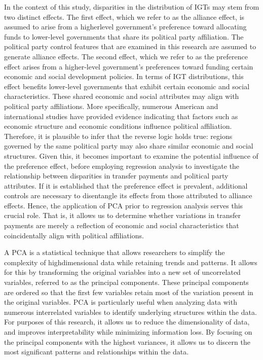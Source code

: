 In the context of this study, disparities in the distribution of IGTs may stem from two distinct effects. The first effect, which we refer to as the alliance effect, is assumed to arise from a higherlevel government's preference toward allocating funds to lower-level governments that share its political party affiliation. The political party control features that are examined in this research are assumed to generate alliance effects. The second effect, which we refer to as the preference effect arises from a higher-level government's preferences toward funding certain economic and social development policies. In terms of IGT distributions, this effect benefits lower-level governments
that exhibit certain economic and social characteristics. These shared economic and social attributes may align with political party affiliations. More specifically, numerous American and international studies have provided evidence indicating that factors such as economic structure and economic
conditions influence political affiliation. Therefore, it is plausible to infer that the reverse logic holds true: regions governed by the same political party may also share similar economic and social structures\parencite{Alan2009Partisanship,anderson2006economic,weatherford1978economic}. Given this, it becomes important to examine the potential influence of the preference effect, before employing regression analysis to investigate the relationship between disparities in transfer payments and political party attributes. If
it is established that the preference effect is prevalent, additional controls are necessary to disentangle its effects from those attributed to alliance effects. Hence, the application of PCA prior to regression analysis serves this crucial role. That is, it allows us to determine whether variations in
transfer payments are merely a reflection of economic and social characteristics that coincidentally align with political affiliations.

A PCA is a statistical technique that allows researchers to simplify the complexity of highdimensional data while retaining trends and patterns. It allows for this by transforming the original variables into a new set of uncorrelated variables, referred to as the principal components. These
principal components are ordered so that the first few variables retain most of the variation present in the original variables. PCA is particularly useful when analyzing data with numerous interrelated variables to identify underlying structures within the data. For purposes of this research, it allows us
to reduce the dimensionality of data, and improves interpretability while minimizing information loss. By focusing on the principal components with the highest variances, it allows us to discern the most significant patterns and relationships within the data.

